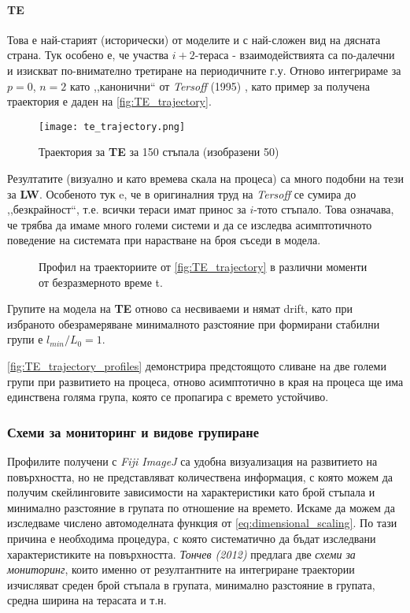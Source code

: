 \paragraph{TE} Това е най-старият (исторически) от моделите и с най-сложен вид на дясната страна. Тук особено е, че участва $i+2$-тераса - взаимодействията са по-далечни и изискват по-внимателно третиране на периодичните г.у. Отново интегрираме за $p = 0$, $n = 2$ като ,,канонични`` от \textit{Tersoff} (1995) \cite{Tersoff1995}, като пример за получена траектория е даден на \autoref{fig:TE_trajectory}.
\begin{figure}[htbp]
	\centering
	\texttt{[image: te\_trajectory.png]}
	\caption{Траектория за \textbf{TE} за 150 стъпала (изобразени 50)}
	\label{fig:TE_trajectory}
\end{figure}
Резултатите (визуално и като времева скала на процеса) са много подобни на тези за \textbf{LW}. Особеното тук e, че в оригиналния труд на \textit{Tersoff} се сумира до ,,безкрайност``, т.е. всички тераси имат принос за $i$-тото стъпало. Това означава, че трябва да имаме много големи системи и да се изследва асимптотичното поведение на системата при нарастване на броя съседи в модела.
\begin{figure}[hbpt]
    \centering
    \caption{Профил на траекториите от \autoref{fig:TE_trajectory} в различни моменти от безразмерното време t.}
    \label{fig:TE_trajectory_profiles}
\end{figure}
Групите на модела на \textbf{TE} отново са несвиваеми и нямат drift, като при избраното обезрамеряване минималното разстояние при формирани стабилни групи е $l_{min}/L_{0} = 1$. 

\autoref{fig:TE_trajectory_profiles} демонстрира предстоящото сливане на две големи групи при развитието на процеса, отново асимптотично в края на процеса ще има единствена голяма група, която се пропагира с времето устойчиво.

\subsubsection{Схеми за мониторинг и видове групиране}
Профилите получени с \textit{Fiji ImageJ} са удобна визуализация на развитието на повърхността, но не представляват количествена информация, с която можем да получим скейлинговите зависимости на характеристики като брой стъпала и минимално разстояние в групата по отношение на времето. Искаме да можем да изследваме числено автомоделната функция от \autoref{eq:dimensional_scaling}. По тази причина е необходима процедура, с която систематично да бъдат изследвани характеристиките на повърхността. \textit{Тончев (2012)} \cite{TonchevArxiv2012} предлага две \textit{схеми за мониторинг}, които именно от резултантните на интегриране траектории изчисляват среден брой стъпала в групата, минимално разстояние в групата, средна ширина на терасата и т.н. 

